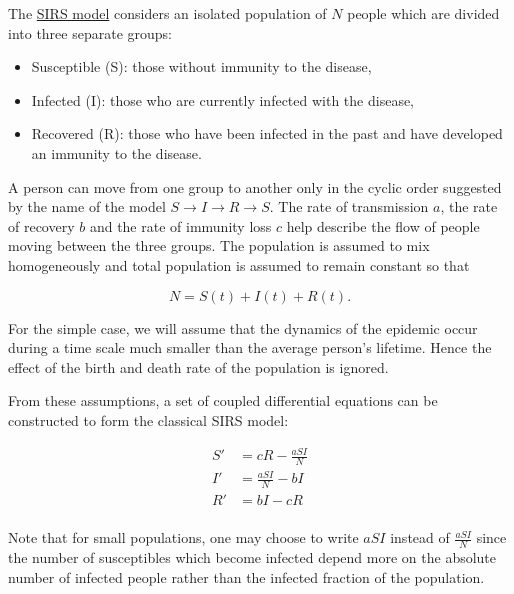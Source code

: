 \documentclass[%
oneside,                 %
final,                   %
10pt]{article}
\begin{document}
The \href{{https://en.wikipedia.org/wiki/Compartmental_models_in_epidemiology}}{SIRS model} considers an isolated population of $N$ people which are divided into three separate groups: 

\begin{itemize}
  \item Susceptible (S): those without immunity to the disease,

  \item Infected (I): those who are currently infected with the disease,

  \item Recovered (R): those who have been infected in the past and have developed an immunity to the disease.
\end{itemize}

\noindent
A person can move from one group to another only in the cyclic order
suggested by the name of the model 
$S\rightarrow I \rightarrow R\rightarrow S$. 
The rate of transmission $a$, the rate of recovery $b$
and the rate of immunity loss $c$ help describe the flow of people
moving between the three groups. The population is assumed to mix
homogeneously and total population is assumed to remain constant so
that

\begin{equation}
N = S(t)+I(t)+R(t).
\end{equation}

For the simple case, we will assume that the dynamics of the epidemic
occur during a time scale much smaller than the average person's
lifetime. Hence the effect of the birth and death rate of the
population is ignored.

From these assumptions, a set of coupled differential equations can be constructed to form the classical SIRS model:

\begin{equation}
\begin{split}
S'&=cR-\frac{aSI}{N}\\
I'&=\frac{aSI}{N}-bI\\
R'&=bI-cR\\
\end{split}
\end{equation}

Note that for small populations, one may choose to write $aSI$ instead
of $\frac{aSI}{N}$ since the number of susceptibles which become
infected depend more on the absolute number of infected people rather
than the infected fraction of the population.
\end{document}
